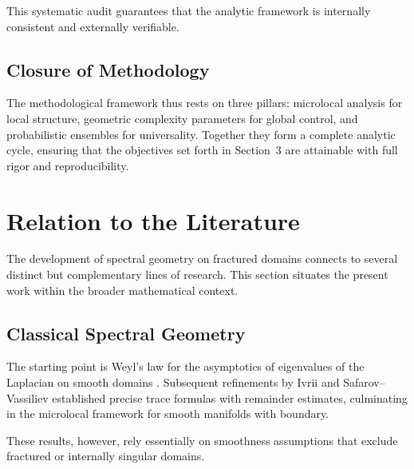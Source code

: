 This systematic audit guarantees that the analytic framework is 
internally consistent and externally verifiable.

\subsection*{Closure of Methodology}

The methodological framework thus rests on three pillars:
microlocal analysis for local structure, 
geometric complexity parameters for global control, 
and probabilistic ensembles for universality. 
Together they form a complete analytic cycle, 
ensuring that the objectives set forth in Section~3 are attainable 
with full rigor and reproducibility.



\section{Relation to the Literature}

The development of spectral geometry on fractured domains connects to several 
distinct but complementary lines of research. This section situates the present 
work within the broader mathematical context.

\subsection*{Classical Spectral Geometry}

The starting point is Weyl's law for the asymptotics of eigenvalues of the 
Laplacian on smooth domains \cite{Weyl1911}. Subsequent refinements by Ivrii 
\cite{Ivrii1980} and Safarov--Vassiliev \cite{SafarovVassiliev1997} established 
precise trace formulas with remainder estimates, culminating in the microlocal 
framework for smooth manifolds with boundary. 

These results, however, rely essentially on smoothness assumptions that exclude 
fractured or internally singular domains.


